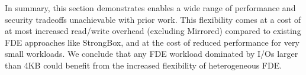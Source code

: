 In summary, this section demonstrates \sys enables a wide range of performance
and security tradeoffs unachievable with prior work. This flexibility comes at a
cost of at most  increased read/write overhead (excluding
Mirrored) compared to existing FDE approaches like StrongBox, and at the cost of
reduced performance for very small workloads. We conclude that any FDE workload
dominated by I/Os larger than 4KB could benefit from the increased flexibility
of heterogeneous FDE.

